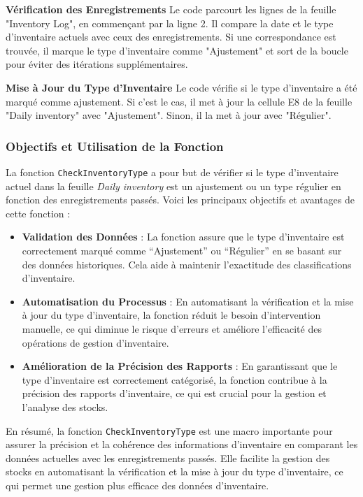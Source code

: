 \documentclass[a4paper, oneside, 12pt, final]{extreport}
\begin{document}
\textbf{Vérification des Enregistrements}
Le code parcourt les lignes de la feuille "Inventory Log", en commençant par la ligne 2. Il compare la date et le type d'inventaire actuels avec ceux des enregistrements. Si une correspondance est trouvée, il marque le type d'inventaire comme "Ajustement" et sort de la boucle pour éviter des itérations supplémentaires.

\textbf{Mise à Jour du Type d'Inventaire}
Le code vérifie si le type d'inventaire a été marqué comme ajustement. Si c'est le cas, il met à jour la cellule E8 de la feuille "Daily inventory" avec "Ajustement". Sinon, il la met à jour avec "Régulier".
\subsubsection{Objectifs et Utilisation de la Fonction}

La fonction \texttt{CheckInventoryType} a pour but de vérifier si le type d'inventaire actuel dans la feuille \textit{Daily inventory} est un ajustement ou un type régulier en fonction des enregistrements passés. Voici les principaux objectifs et avantages de cette fonction :

\begin{itemize}
    \item \textbf{Validation des Données} : La fonction assure que le type d'inventaire est correctement marqué comme ``Ajustement'' ou ``Régulier'' en se basant sur des données historiques. Cela aide à maintenir l'exactitude des classifications d'inventaire.
    \item \textbf{Automatisation du Processus} : En automatisant la vérification et la mise à jour du type d'inventaire, la fonction réduit le besoin d'intervention manuelle, ce qui diminue le risque d'erreurs et améliore l'efficacité des opérations de gestion d'inventaire.
    \item \textbf{Amélioration de la Précision des Rapports} : En garantissant que le type d'inventaire est correctement catégorisé, la fonction contribue à la précision des rapports d'inventaire, ce qui est crucial pour la gestion et l'analyse des stocks.
\end{itemize}

En résumé, la fonction \texttt{CheckInventoryType} est une macro importante pour assurer la précision et la cohérence des informations d'inventaire en comparant les données actuelles avec les enregistrements passés. Elle facilite la gestion des stocks en automatisant la vérification et la mise à jour du type d'inventaire, ce qui permet une gestion plus efficace des données d'inventaire.
\end{document}
